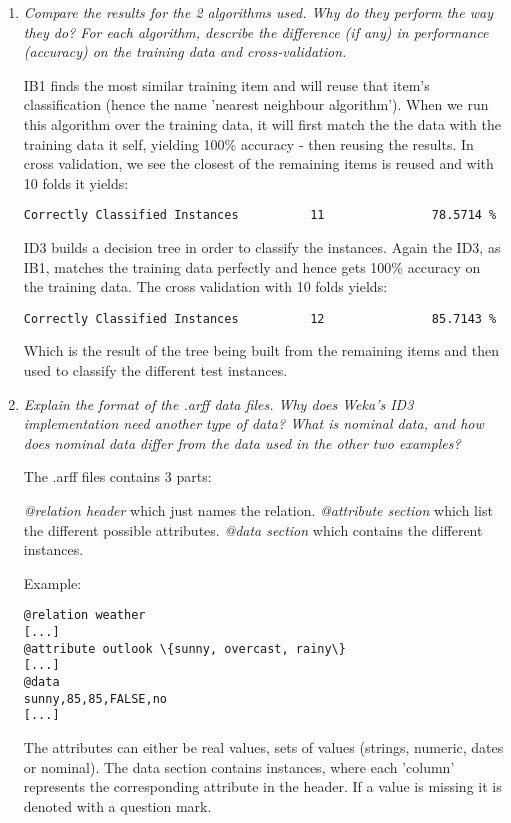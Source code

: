 \documentclass{article}
\begin{document}
\begin{enumerate}[1.]
\item \textit{ Compare the results for the 2 algorithms used. Why do they perform
the way they do? For each algorithm, describe the difference (if any) in
performance (accuracy) on the training data and cross-validation.}

IB1 finds the most similar training item and will reuse that item's
classification (hence the name 'nearest neighbour algorithm'). When we run this
algorithm over the training data, it will first match the the data with the
training data it self, yielding 100\% accuracy - then reusing the results.
In cross validation, we see the closest of the remaining items is reused and
with 10 folds it yields:

\begin{verbatim}
Correctly Classified Instances          11               78.5714 %
\end{verbatim}

ID3 builds a decision tree in order to classify the instances. Again the ID3,
as IB1, matches the training data perfectly and hence gets 100\% accuracy on
the training data. The cross validation with 10 folds yields:

\begin{verbatim}
Correctly Classified Instances          12               85.7143 %
\end{verbatim}

Which is the result of the tree being built from the remaining items and then
used to classify the different test instances.

\item \textit{ Explain the format of the .arff data files. Why does Weka's ID3
implementation need another type of data? What is nominal data, and how does
nominal data differ from the data used in the other two examples?}

The .arff files contains 3 parts:

\textit{ @relation header} which just names the relation.
\textit{ @attribute section} which list the different possible attributes.
\textit{ @data section} which contains the different instances.

Example:
\begin{verbatim}
@relation weather
[...]
@attribute outlook \{sunny, overcast, rainy\}
[...]
@data
sunny,85,85,FALSE,no
[...]
\end{verbatim}

The attributes can either be real values, sets of values (strings, numeric,
dates or nominal). The data section contains instances, where each 'column'
represents the corresponding attribute in the header.
If a value is missing it is denoted with a question mark.


\end{enumerate}
\end{document}
